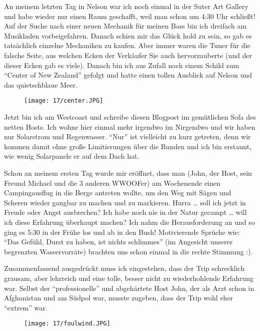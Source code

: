 An meinem letzten Tag in Nelson war ich noch einmal in der Suter Art
Gallery und habe wieder nur einen Raum geschafft, weil man schon um 4:30
Uhr schließt! Auf der Suche nach einer neuen Mechanik für meinen Bass
bin ich dreifach am Musikladen vorbeigefahren. Danach schien mir das
Glück hold zu sein, so gab es tatsächlich einzelne Mechaniken zu kaufen.
Aber immer waren die Tuner für die falsche Seite, aus welchen Ecken der
Verkäufer Sie auch hervorzauberte (und der dieser Ecken gab es viele).
Danach bin ich aus Zufall noch einem Schild zum ``Center of New Zealand''
gefolgt und hatte einen tollen Ausblick auf Nelson und das quietschblaue
Meer.
\begin{figure}[h]
  \centering
  \texttt{[image: 17/center.JPG]}
\end{figure}

Jetzt bin ich am Westcoast und schreibe diesen Blogpost im gemütlichen
Sofa des netten Hosts. Ich wohne hier einmal mehr irgendwo im
Nirgendwo und wir haben nur Solarstrom und Regenwasser. ``Nur'' ist
vielleicht zu kurz getreten, denn wir kommen damit ohne große
Limitierungen über die Runden und ich bin erstaunt, wie wenig
Solarpanele er auf dem Dach hat.

Schon an meinem ersten Tag wurde mir eröffnet, dass man (John, der
Host, sein Freund Michael und die 3 anderen WWOOFer) am Wochenende
einen Campingausflug in die Berge antreten wollte, um den Weg mit
Sägen und Scheren wieder gangbar zu machen und zu markieren. Hurra
\ldots{} soll ich jetzt in Freude oder Angst ausbrechen? Ich habe noch
nie in der Natur gecampt \ldots{} will ich diese Erfahrung überhaupt
machen? Ich nahm die Herausforderung an und so ging es 5:30 in der
Frühe los und ab in den Bush! Motivierende Sprüche wie: ``Das Gefühl,
Durst zu haben, ist nichts schlimmes'' (im Angesicht unserer begrenzten
Wasservorräte) brachten uns schon einmal in die rechte Stimmung :).

Zusammenfassend ausgedrückt muss ich eingestehen, dass der Trip
schrecklich grausam, aber lehrreich und eine tolle, besser nicht zu
wiederhohlende Erfahrung war. Selbst der ``professionelle'' und
abgehärtete Host John, der als Arzt schon in Afghanistan und am Südpol
war, musste zugeben, dass der Trip wohl eher ``extrem'' war.
\begin{figure}[h]
  \centering
  \texttt{[image: 17/foulwind.JPG]}
\end{figure}

